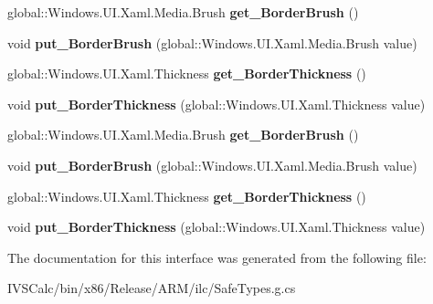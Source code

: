 \begin{DoxyCompactItemize}
\item 
\mbox{\label{interface_windows_1_1_u_i_1_1_xaml_1_1_controls_1_1_i_stack_panel2_a10338f92faf84217b61660cdff15501f}} 
global\+::\+Windows.\+U\+I.\+Xaml.\+Media.\+Brush {\bfseries get\+\_\+\+Border\+Brush} ()
\item 
\mbox{\label{interface_windows_1_1_u_i_1_1_xaml_1_1_controls_1_1_i_stack_panel2_ae6c67abfd4b96b9db52ac7024e143420}} 
void {\bfseries put\+\_\+\+Border\+Brush} (global\+::\+Windows.\+U\+I.\+Xaml.\+Media.\+Brush value)
\item 
\mbox{\label{interface_windows_1_1_u_i_1_1_xaml_1_1_controls_1_1_i_stack_panel2_ae09be2dac045dee9ffca344ee32050f2}} 
global\+::\+Windows.\+U\+I.\+Xaml.\+Thickness {\bfseries get\+\_\+\+Border\+Thickness} ()
\item 
\mbox{\label{interface_windows_1_1_u_i_1_1_xaml_1_1_controls_1_1_i_stack_panel2_a8a840e0862f27b4941c7f920b2986255}} 
void {\bfseries put\+\_\+\+Border\+Thickness} (global\+::\+Windows.\+U\+I.\+Xaml.\+Thickness value)
\item 
\mbox{\label{interface_windows_1_1_u_i_1_1_xaml_1_1_controls_1_1_i_stack_panel2_a10338f92faf84217b61660cdff15501f}} 
global\+::\+Windows.\+U\+I.\+Xaml.\+Media.\+Brush {\bfseries get\+\_\+\+Border\+Brush} ()
\item 
\mbox{\label{interface_windows_1_1_u_i_1_1_xaml_1_1_controls_1_1_i_stack_panel2_ae6c67abfd4b96b9db52ac7024e143420}} 
void {\bfseries put\+\_\+\+Border\+Brush} (global\+::\+Windows.\+U\+I.\+Xaml.\+Media.\+Brush value)
\item 
\mbox{\label{interface_windows_1_1_u_i_1_1_xaml_1_1_controls_1_1_i_stack_panel2_ae09be2dac045dee9ffca344ee32050f2}} 
global\+::\+Windows.\+U\+I.\+Xaml.\+Thickness {\bfseries get\+\_\+\+Border\+Thickness} ()
\item 
\mbox{\label{interface_windows_1_1_u_i_1_1_xaml_1_1_controls_1_1_i_stack_panel2_a8a840e0862f27b4941c7f920b2986255}} 
void {\bfseries put\+\_\+\+Border\+Thickness} (global\+::\+Windows.\+U\+I.\+Xaml.\+Thickness value)
\end{DoxyCompactItemize}


The documentation for this interface was generated from the following file\+:\begin{DoxyCompactItemize}
\item 
I\+V\+S\+Calc/bin/x86/\+Release/\+A\+R\+M/ilc/Safe\+Types.\+g.\+cs\end{DoxyCompactItemize}
